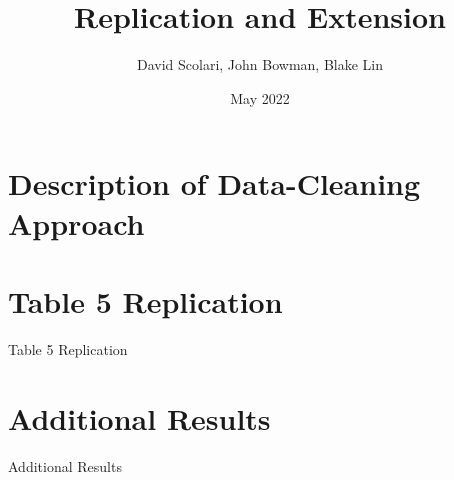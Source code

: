 \documentclass{article}
\author{David Scolari, John Bowman, Blake Lin}
\title{Replication and Extension}
\date{May 2022}
\begin{document}
\maketitle
\section*{Description of Data-Cleaning Approach}

\section*{Table 5 Replication}
\begin{table}[htbp]
   \centering
   \caption{Table 5 Replication}
  
   \label{tab:booktabs}
\end{table}





\section*{Additional Results}

\begin{table}[htbp]
   \centering
   \caption{Additional Results}
  
   \label{tab:booktabs}
\end{table}
\end{document}
